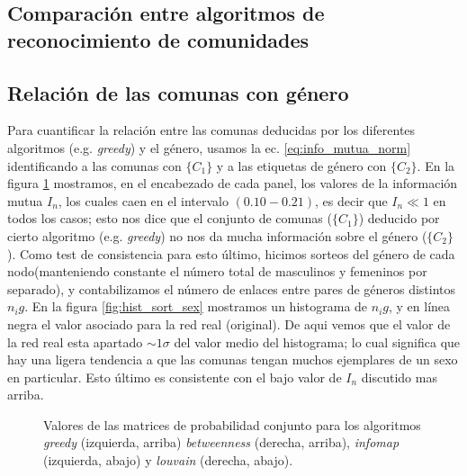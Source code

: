 \subsection{Comparaci\'on entre algoritmos de reconocimiento de comunidades}



\subsection{Relaci\'on de las comunas con g\'enero}
\label{sec:relacion_con_genero}

Para cuantificar la relaci\'on entre las comunas deducidas por los diferentes algoritmos (e.g. {\it greedy}) y el g\'enero, usamos la ec. \ref{eq:info_mutua_norm} identificando a las comunas con $\{C_1\}$ y a las etiquetas de g\'enero con $\{C_2\}$.
En la figura \ref{fig:prob_conj} mostramos, en el encabezado de cada panel, los valores de la informaci\'on mutua $I_n$, los cuales caen en el intervalo $(0.10 - 0.21)$, es decir que $I_n \ll 1$ en todos los casos; esto nos dice que el conjunto de comunas ($\{C_1\}$) deducido por cierto algoritmo (e.g. {\it greedy}) no nos da mucha informaci\'on sobre el g\'enero ($\{C_2\}$).
Como test de consistencia para esto  \'ultimo, hicimos sorteos del g\'enero de cada nodo(manteniendo constante el n\'umero total de masculinos y femeninos por separado), y contabilizamos el n\'umero de enlaces entre pares de g\'eneros distintos $n_ig$.
En la figura \ref{fig:hist_sort_sex} mostramos un histograma de $n_ig$, y en l\'inea negra el valor asociado para la red real (original).
De aqui vemos que el valor de la red real esta apartado $\sim 1 \sigma$ del valor medio del histograma; lo cual significa que hay una ligera tendencia a que las comunas tengan muchos ejemplares de un sexo en particular.
Esto \'ultimo es consistente con el bajo valor de $I_n$ discutido mas arriba.


\begin{figure}
    \centering
    \caption{
    Valores de las matrices de probabilidad conjunto para los algoritmos {\it greedy} (izquierda, arriba) {\it betweenness} (derecha, arriba), {\it infomap} (izquierda, abajo) y {\it louvain} (derecha, abajo). 
    }
\label{fig:prob_conj}
\end{figure}


